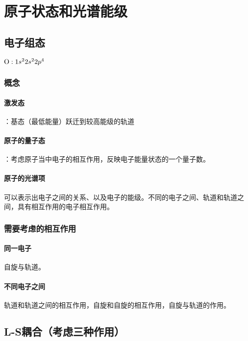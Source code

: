 \section{原子状态和光谱能级}

\subsection{电子组态}

\begin{center}
	$\ce{O}: 1s^22s^22p^4$
\end{center}

\subsubsection{概念}

\paragraph{激发态}：基态（最低能量）跃迁到较高能级的轨道

\paragraph{原子的量子态}：考虑原子当中电子的相互作用，反映电子能量状态的一个量子数。

\paragraph{原子的光谱项} 可以表示出电子之间的关系、以及电子的能级。不同的电子之间、轨道和轨道之间，具有相互作用的电子相互作用。

\subsubsection{需要考虑的相互作用}

\paragraph{同一电子} 自旋与轨道。

\paragraph{不同电子之间} 轨道和轨道之间的相互作用，自旋和自旋的相互作用，自旋与轨道的作用。


\subsection{L-S耦合（考虑三种作用）}

